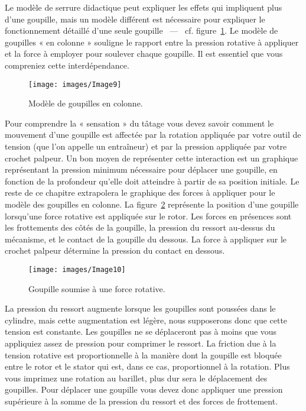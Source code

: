 \documentclass[a4paper,french,11pt,twoside]{report}
\begin{document}
Le modèle de serrure didactique peut expliquer les effets qui impliquent plus d'une goupille, mais un modèle différent est nécessaire pour expliquer le fonctionnement détaillé d'une seule goupille ~---~ cf. figure~\ref{modele_goupilles_colonne}. Le modèle de goupilles « en colonne » souligne le rapport entre la pression rotative à appliquer et la force à employer pour soulever chaque goupille. Il est essentiel que vous compreniez cette interdépendance.

\begin{figure}[ht]
  \begin{center}
    \texttt{[image: images/Image9]}
    \caption{Modèle de goupilles en colonne.\label{modele_goupilles_colonne}}
  \end{center}
\end{figure}

Pour comprendre la « sensation » du tâtage vous devez savoir comment le mouvement d'une goupille est affectée par la rotation appliquée par votre outil de tension (que l'on appelle un entraîneur) et par la pression appliquée par votre crochet palpeur. Un bon moyen de représenter cette interaction est un graphique représentant la pression minimum nécessaire pour déplacer une goupille, en fonction de la profondeur qu'elle doit atteindre à partir de sa position initiale. Le reste de ce chapitre extrapolera le graphique des forces à appliquer pour le modèle des goupilles en colonne. La figure~\ref{goupille_force_rotative} représente la position d'une goupille lorsqu'une force rotative est appliquée sur le rotor. Les forces en présences sont les frottements des côtés de la goupille, la pression du ressort au-dessus du mécanisme, et le contact de la goupille du dessous. La force à appliquer sur le crochet palpeur détermine la pression du contact en dessous.

\begin{figure}[ht]
  \begin{center}
    \texttt{[image: images/Image10]}
    \caption{Goupille soumise à une force rotative.\label{goupille_force_rotative}}
  \end{center}
\end{figure}

La pression du ressort augmente lorsque les goupilles sont poussées dans le cylindre, mais cette augmentation est légère, nous supposerons donc que cette tension est constante. Les goupilles ne se déplaceront pas à moins que vous appliquiez assez de pression pour comprimer le ressort. La friction due à la tension rotative est proportionnelle à la manière dont la goupille est bloquée entre le rotor et le stator qui est, dans ce cas, proportionnel à la rotation. Plus vous imprimez une rotation au barillet, plus dur sera le déplacement des goupilles. Pour déplacer une goupille vous devez donc appliquer une pression supérieure à la somme de la pression du ressort et des forces de frottement.
\end{document}
